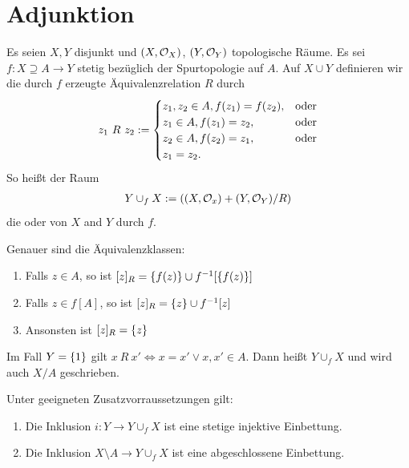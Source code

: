 \documentclass{report}
\begin{document}
\section{Adjunktion}
\begin{definition}
	Es seien $X,Y$ disjunkt und $(X, \mathcal{O}_X)$, $(Y, \mathcal{O}_Y)$ topologische Räume. Es sei $f : X \supseteq A \to Y$ stetig bezüglich der Spurtopologie auf $A$. Auf $X \cup Y$ definieren wir die durch $f$ erzeugte Äquivalenzrelation $R$ durch
	\begin{align*}
		z_1~R~z_2 := 
		\begin{cases}
			z_1,z_2 \in A, f(z_1) = f(z_2), &\textnormal{oder}\\
			z_1 \in A, f(z_1) = z_2,
			&\textnormal{oder}\\
			z_2 \in A, f(z_2) = z_1,
			&\textnormal{oder}\\
			z_1 = z_2.
		\end{cases} 
	\end{align*}
	So heißt der Raum 
	\begin{align*}
		Y \cup_f X := \qty((X, \mathcal{O}_x) + (Y, \mathcal{O}_Y) / R)
	\end{align*}
	die  oder  von $X$ and $Y$ durch $f$.
\end{definition}
Genauer sind die Äquivalenzklassen:
\begin{enumerate}
	\item Falls $z \in A$, so ist 
	$[z]_R = \qty{f(z)} \cup f^{-1}[\qty{f(z)}]$
	\item Falls $z \in f[A]$, so ist
	$[z]_R = \qty{z} \cup f^{-1}[z]$
	\item Ansonsten ist $[z]_R = \qty{z}$
\end{enumerate}
\begin{definition}
	Im Fall $Y = \qty{1}$ gilt $x~R~x' \Leftrightarrow x = x' \vee x, x' \in A$. Dann heißt $Y \cup_f X$  und wird auch $X / A$ geschrieben.
\end{definition}
\begin{proposition}
	Unter geeigneten Zusatzvorraussetzungen gilt:
	\begin{enumerate}
		\item Die Inklusion $i : Y \to Y \cup_f X$ ist eine stetige injektive Einbettung.
		\item Die Inklusion $X \setminus A \to Y \cup_f X$ ist eine abgeschlossene Einbettung.
	\end{enumerate}
\end{proposition}
\end{document}
